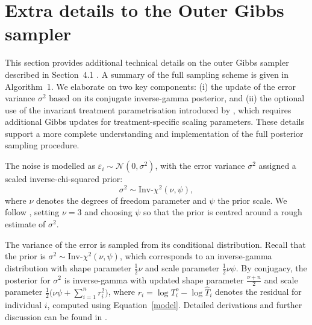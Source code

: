 \section{Extra details to the Outer Gibbs sampler}

This section provides additional technical details on the outer Gibbs sampler described in Section~4.1 \citep{main_article}. 
A summary of the full sampling scheme is given in Algorithm~1. 
We elaborate on two key components: (i) the update of the error variance $\sigma^2$ based on its conjugate inverse-gamma posterior, and (ii) the optional use of the invariant treatment parametrisation introduced by \citet{hahn2020bayesian}, which requires additional Gibbs updates for treatment-specific scaling parameters. 
These details support a more complete understanding and implementation of the full posterior sampling procedure.

The noise is modelled as $\varepsilon_i \sim \mathcal{N}(0, \sigma^2)$, with the error variance $\sigma^2$ assigned a scaled inverse-chi-squared prior:
\begin{equation}
\sigma^2 \sim \text{Inv-}\chi^2(\nu, \psi),
\end{equation}
where $\nu$ denotes the degrees of freedom parameter and $\psi$ the prior scale. We follow \citet{BARToriginal}, setting $\nu = 3$ and choosing $\psi$ so that the prior is centred around a rough estimate of $\sigma^2$.

The variance of the error is sampled from its conditional distribution.
Recall that the prior is $\sigma^2 \sim \text{Inv-}\chi^2(\nu, \psi)$, which corresponds to an inverse-gamma distribution with shape parameter $\frac{1}{2}\nu$ and scale parameter $\frac{1}{2}\nu \psi$. 
By conjugacy, the posterior for $\sigma^2$ is inverse-gamma with updated shape parameter $\frac{\nu + n}{2}$ and scale parameter $\frac{1}{2}\bigl(\nu \psi + \sum_{i=1}^n r_i^2\bigr)$, where $r_i = \log{T^o_i} - \log{\widehat{T}_i}$ denotes the residual for individual $i$, computed using Equation~\eqref{model}.
Detailed derivations and further discussion can be found in \citet[Section 3.2 and 14.2]{Gelman2013BDA}.


